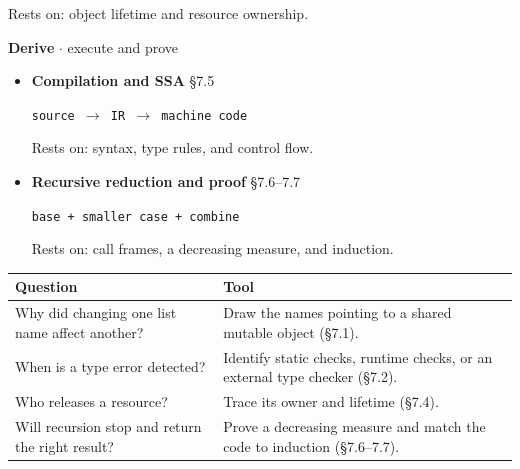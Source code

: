 \documentclass[11pt]{article}
\begin{document}
\begin{keepsection}
\begin{itemize}
Rests on: object lifetime and resource ownership.
\end{itemize}

\textbf{Derive} \ensuremath{\cdot} execute and prove

\begin{itemize}
\item {}
\textbf{Compilation and SSA} \hfill{\small\color{FAUblue}§7.5}

\texttt{source \ensuremath{\to} IR \ensuremath{\to} machine code}

Rests on: syntax, type rules, and control flow.
\item {}
\textbf{Recursive reduction and proof} \hfill{\small\color{FAUblue}§7.6–7.7}

\texttt{base + smaller case + combine}

Rests on: call frames, a decreasing measure, and induction.
\end{itemize}

\begin{center}\small\begin{tabularx}{\linewidth}{>{\raggedright\arraybackslash}X>{\raggedright\arraybackslash}X}\toprule
\textbf{Question} & \textbf{Tool} \\ \midrule
Why did changing one list name affect another? & Draw the names pointing to a shared mutable object (§7.1). \\
When is a type error detected? & Identify static checks, runtime checks, or an external type checker (§7.2). \\
Who releases a resource? & Trace its owner and lifetime (§7.4). \\
Will recursion stop and return the right result? & Prove a decreasing measure and match the code to induction (§7.6–7.7). \\
\bottomrule\end{tabularx}\end{center}
\end{keepsection}
\end{document}
